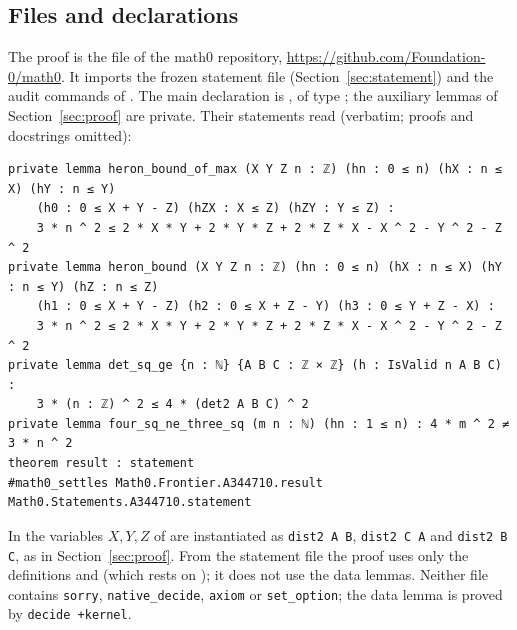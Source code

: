 \documentclass[11pt]{amsart}
\theoremstyle{plain}
\theoremstyle{definition}
\begin{document}
\subsection*{Files and declarations}
The proof is the file  of the math0 repository, \url{https://github.com/Foundation-0/math0}. It imports the frozen statement file  (Section~\ref{sec:statement}) and the audit commands of . The main declaration is , of type ; the auxiliary lemmas of Section~\ref{sec:proof} are private. Their statements read (verbatim; proofs and docstrings omitted):
\begin{lstlisting}
private lemma heron_bound_of_max (X Y Z n : ℤ) (hn : 0 ≤ n) (hX : n ≤ X) (hY : n ≤ Y)
    (h0 : 0 ≤ X + Y - Z) (hZX : X ≤ Z) (hZY : Y ≤ Z) :
    3 * n ^ 2 ≤ 2 * X * Y + 2 * Y * Z + 2 * Z * X - X ^ 2 - Y ^ 2 - Z ^ 2
private lemma heron_bound (X Y Z n : ℤ) (hn : 0 ≤ n) (hX : n ≤ X) (hY : n ≤ Y) (hZ : n ≤ Z)
    (h1 : 0 ≤ X + Y - Z) (h2 : 0 ≤ X + Z - Y) (h3 : 0 ≤ Y + Z - X) :
    3 * n ^ 2 ≤ 2 * X * Y + 2 * Y * Z + 2 * Z * X - X ^ 2 - Y ^ 2 - Z ^ 2
private lemma det_sq_ge {n : ℕ} {A B C : ℤ × ℤ} (h : IsValid n A B C) :
    3 * (n : ℤ) ^ 2 ≤ 4 * (det2 A B C) ^ 2
private lemma four_sq_ne_three_sq (m n : ℕ) (hn : 1 ≤ n) : 4 * m ^ 2 ≠ 3 * n ^ 2
theorem result : statement
#math0_settles Math0.Frontier.A344710.result Math0.Statements.A344710.statement
\end{lstlisting}
In  the variables $X,Y,Z$ of  are instantiated as \texttt{dist2 A B}, \texttt{dist2 C A} and \texttt{dist2 B C}, as in Section~\ref{sec:proof}. From the statement file the proof uses only the definitions and  (which rests on ); it does not use the data lemmas. Neither file contains \texttt{sorry}, \texttt{native\_decide}, \texttt{axiom} or \texttt{set\_option}; the data lemma  is proved by \texttt{decide +kernel}.
\end{document}
